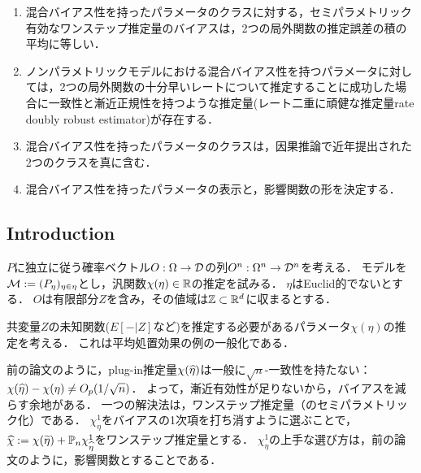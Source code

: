 \documentclass[uplatex,dvipdfmx]{jsreport}
\begin{document}
\begin{tcolorbox}[colframe=ForestGreen, colback=ForestGreen!10!white,breakable,colbacktitle=ForestGreen!40!white,coltitle=black,fonttitle=\bfseries\sffamily,
title=]
    \begin{enumerate}
        \item 混合バイアス性を持ったパラメータのクラスに対する，セミパラメトリック有効なワンステップ推定量のバイアスは，2つの局外関数の推定誤差の積の平均に等しい．
        \item ノンパラメトリックモデルにおける混合バイアス性を持つパラメータに対しては，2つの局外関数の十分早いレートについて推定することに成功した場合に一致性と漸近正規性を持つような推定量(レート二重に頑健な推定量rate doubly robust estimator)が存在する．
        \item 混合バイアス性を持ったパラメータのクラスは，因果推論で近年提出された2つのクラスを真に含む．
        \item 混合バイアス性を持ったパラメータの表示と，影響関数の形を決定する．
    \end{enumerate}
\end{tcolorbox}

\subsection{Introduction}

\begin{notation}
    $P$に独立に従う確率ベクトル$O:\Omega\to\mathcal{D}$の列$O^n:\Omega^n\to\mathcal{D}^n$を考える．
    モデルを$\mathcal{M}:=(P_\eta)_{\eta\in\eta}$とし，汎関数$\chi(\eta)\in\mathbb{R}$の推定を試みる．
    $\eta$はEuclid的でないとする．
    $O$は有限部分$Z$を含み，その値域は$\mathbb{Z}\subset\mathbb{R}^d$に収まるとする．
\end{notation}

\begin{problem}
    共変量$Z$の未知関数($E[-|Z]$など)を推定する必要があるパラメータ$\chi(\eta)$の推定を考える．
    これは平均処置効果の例の一般化である．
\end{problem}

\begin{discussion}
    前の論文のように，plug-in推定量$\chi(\widehat{\eta})$は一般に$\sqrt{n}$-一致性を持たない：$\chi(\widehat{\eta})-\chi(\eta)\ne O_p(1/\sqrt{n})$．
    よって，漸近有効性が足りないから，バイアスを減らす余地がある．
    一つの解決法は，ワンステップ推定量（のセミパラメトリック化）である．
    $\chi_\eta^1$をバイアスの1次項を打ち消すように選ぶことで，$\widehat{\chi}:=\chi(\widetilde{\eta})+\mathbb{P}_n\chi^1_{\widehat{\eta}}$をワンステップ推定量とする．
    $\chi^1_\eta$の上手な選び方は，前の論文のように，影響関数とすることである．
\end{discussion}
\end{document}

